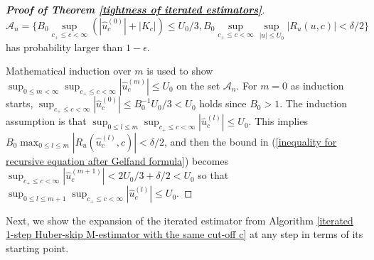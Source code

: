 \documentclass[11pt, letterpaper]{article}
\numberwithin{algorithm}{section}
\numberwithin{assumption}{section}
\numberwithin{lemma}{section}
\numberwithin{theorem}{section}
\numberwithin{corollary}{section}
\numberwithin{remark}{section}
\numberwithin{equation}{section}
\numberwithin{figure}{section}
\numberwithin{table}{section}
\begin{document}
\begin{proof}[\textnormal{\textbf{Proof of Theorem \ref{tightness of iterated estimators}}}]
\begin{equation} \label{large probability set for tightness and fixed point}
\mathcal{A}_{n} = \{ B_{0} \sup_{c_{+} \le c < \infty} (|\widehat{u}_{c}^{(0)}| + |K_{c}|) \le U_{0}/3, B_{0} \sup_{c_{+} \le c < \infty} \sup_{|u| \le U_{0}} |R_{u}(u, c)| < \delta / 2 \}
\end{equation}
has probability larger than $1 - \epsilon$.

Mathematical induction over $m$ is used to show $\sup_{0 \le m < \infty} \sup_{c_{+} \le c < \infty} |\widehat{u}_{c}^{(m)}| \le U_{0}$ on the set $\mathcal{A}_{n}$. For $m = 0$ as induction starts, $\sup_{c_{+} \le c < \infty} |\widehat{u}_{c}^{(0)}| \le B_{0}^{-1}U_{0}/3 < U_{0}$ holds since $B_{0} > 1$. The induction assumption is that $\sup_{0 \le l \le m} \sup_{c_{+} \le c < \infty} |\widehat{u}_{c}^{(l)}| \le U_{0}$. This implies $B_{0} \max_{0 \le l \le m} |R_{u}(\widehat{u}_{c}^{(l)}, c)| < \delta / 2$, and then the bound in (\ref{inequality for recursive equation after Gelfand formula}) becomes $\sup_{c_{+} \le c < \infty} |\widehat{u}_{c}^{(m+1)}| < 2U_{0}/3 + \delta / 2 < U_{0}$ so that $\sup_{0 \le l \le m+1} \sup_{c_{+} \le c < \infty} |\widehat{u}_{c}^{(l)}| \le U_{0}$.
\end{proof}

Next, we show the expansion of the iterated estimator from Algorithm \ref{iterated 1-step Huber-skip M-estimator with the same cut-off c} at any step in terms of its starting point.
\end{document}
